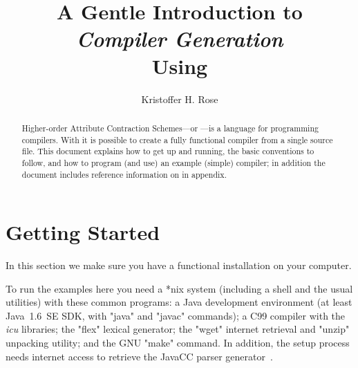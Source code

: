 \documentclass[11pt]{article} %
\title{A Gentle Introduction to\\\emph{Compiler Generation}\\Using \HAX\version}
\author{Kristoffer H. Rose}
\begin{document}
\maketitle

\begin{abstract}\noindent
  Higher-order Attribute Contraction Schemes---or \HAX---is a language for programming compilers.
  With \HAX it is possible to create a fully functional compiler from a single source file.  This
  document explains how to get \HAX up and running, the basic conventions to follow, and how to
  program (and use) an example (simple) compiler; in addition the document includes reference
  information on \HAX in appendix.
\end{abstract}

\compacttableofcontents


\section{Getting Started}

In this section we make sure you have a functional \HAX installation on your computer.

\begin{requirements}
  To run the \HAX examples here you need a *nix system (including a shell and the usual utilities)
  with these common programs: a Java development environment (at least Java~1.6~SE SDK, with "java"
  and "javac" commands); a C99 compiler with the \emph{icu} libraries; the "flex" lexical generator;
  the "wget" internet retrieval and "unzip" unpacking utility; and the GNU "make" command.  In
  addition, the setup process needs internet access to retrieve the JavaCC parser
  generator~\cite{javacc}.
\end{requirements}
\end{document}
